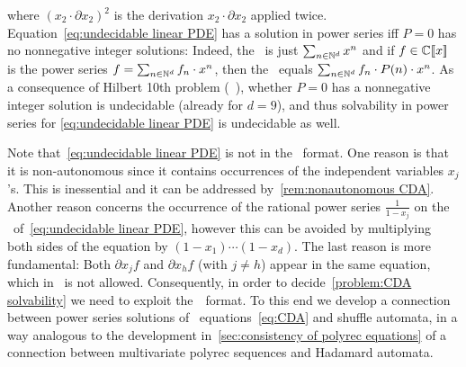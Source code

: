 \begin{remark}
    where $(x_2 \cdot \partial {x_2} {})^2$ is the derivation $x_2 \cdot \partial {x_2} {}$ applied twice.
    Equation~\cref{eq:undecidable linear PDE} has a solution in power series
    iff $P = 0$ has no nonnegative integer solutions:
    Indeed, the \rhs~is just $\sum_{n \in \mathbb N^d} x^n$
    and if $f \in \mathbb C[\![x]\!]$ is the power series $f = \sum_{n \in \mathbb N^d} f_n \cdot x^n$,
    then the \lhs~equals $\sum_{n \in \mathbb N^d} f_n \cdot P(n) \cdot x^n$.
    As a consequence of Hilbert 10th problem (\cf~\cite{Matijasevic:2003}),
    whether $P = 0$ has a nonnegative integer solution is undecidable 
    (already for $d = 9$),
    and thus solvability in power series for \cref{eq:undecidable linear PDE} is undecidable as well.
\end{remark}

Note that~\cref{eq:undecidable linear PDE} is not in the \CDA~format.
%
One reason is that it is non-autonomous since it contains occurrences of the independent variables $x_j$'s.
This is inessential and it can be addressed by~\cref{rem:nonautonomous CDA}.
%
%
Another reason concerns the occurrence of the rational power series $\frac 1 {1 - x_j}$ on the \rhs~of~\cref{eq:undecidable linear PDE},
however this can be avoided by multiplying both sides of the equation by $(1 - x_1) \cdots (1 - x_d)$.
%
The last reason is more fundamental:
Both $\partial {x_j} f$ and $\partial {x_h} f$ (with $j \neq h$) appear in the same equation,
which in \CDA~is not allowed.
%
Consequently, in order to decide~\cref{problem:CDA solvability} we need to exploit the~\CDA~format.
%
To this end we develop a connection between
power series solutions of \CDA~equations~\cref{eq:CDA} and shuffle automata,
in a way analogous to the development in~\cref{sec:consistency of polyrec equations}
of a connection between multivariate polyrec sequences and Hadamard automata.


